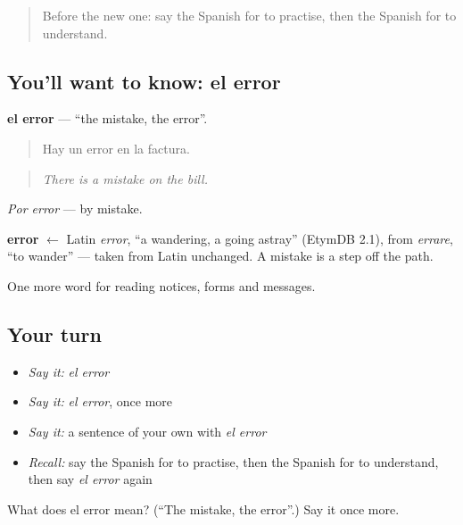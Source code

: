 \begin{quote}
Before the new one: say the Spanish for to practise, then the Spanish for to understand.
\end{quote}

\subsection*{You'll want to know: el error}
\textbf{el error} — \textquotedblleft{}the mistake, the error\textquotedblright{}.

\begin{quote}
Hay un error en la factura.
\end{quote}

\begin{quote}
\emph{There is a mistake on the bill.}
\end{quote}

\emph{Por error} — by mistake.

\begin{cousinweb}
\textbf{error} $\leftarrow$ Latin \emph{error}, \textquotedblleft{}a wandering, a going astray\textquotedblright{} (EtymDB 2.1), from \emph{errare}, \textquotedblleft{}to wander\textquotedblright{} — taken from Latin unchanged. A mistake is a step off the path.
\end{cousinweb}

\begin{grammarlens}[title={What you've built}]
One more word for reading notices, forms and messages.
\end{grammarlens}

\subsection*{Your turn}
\begin{itemize}
\raggedright
  \item \emph{Say it:} \emph{el error}
  \item \emph{Say it:} \emph{el error}, once more
  \item \emph{Say it:} a sentence of your own with \emph{el error}
  \item \emph{Recall:} say the Spanish for to practise, then the Spanish for to understand, then say \emph{el error} again
\end{itemize}

\begin{tcolorbox}[breakable,colback=teal!4,colframe=teal!35!black,title={Before you move on}]
What does el error mean? (\textquotedblleft{}The mistake, the error\textquotedblright{}.) Say it once more.
\end{tcolorbox}
